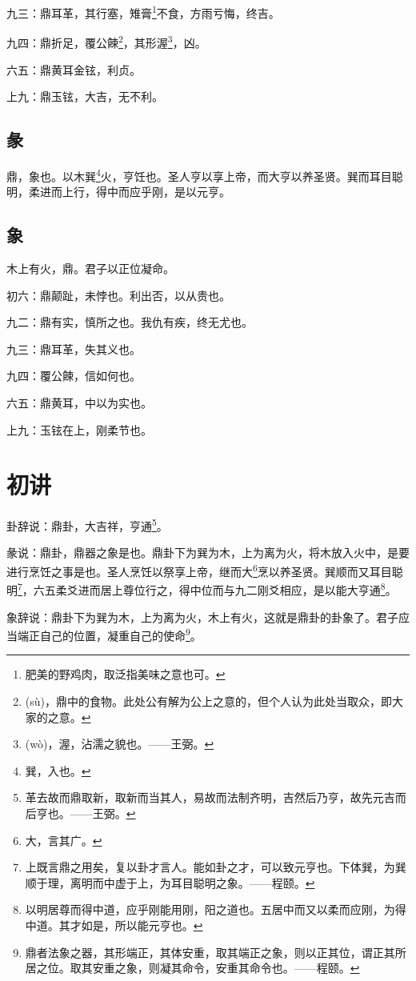 \documentclass[12pt,oneside]{book}
\begin{document}
九三：鼎耳革，其行塞，雉膏\footnote{肥美的野鸡肉，取泛指美味之意也可。}不食，方雨亏悔，终吉。

九四：鼎折足，覆公餗\footnote{(sù)，鼎中的食物。此处公有解为公上之意的，但个人认为此处当取众，即大家的之意。}，其形渥\footnote{(wò)，渥，沾濡之貌也。——王弼。}，凶。

六五：鼎黄耳金铉，利贞。

上九：鼎玉铉，大吉，无不利。

\subsection{彖}
鼎，象也。以木巽\footnote{巽，入也。}火，亨饪也。圣人亨以享上帝，而大亨以养圣贤。巽而耳目聪明，柔进而上行，得中而应乎刚，是以元亨。

\subsection{象}
木上有火，鼎。君子以正位凝命。

初六：鼎颠趾，未悖也。利出否，以从贵也。

九二：鼎有实，慎所之也。我仇有疾，终无尤也。

九三：鼎耳革，失其义也。

九四：覆公餗，信如何也。

六五：鼎黄耳，中以为实也。

上九：玉铉在上，刚柔节也。

\section{初讲}
卦辞说：鼎卦，大吉祥，亨通\footnote{革去故而鼎取新，取新而当其人，易故而法制齐明，吉然后乃亨，故先元吉而后亨也。——王弼。}。

彖说：鼎卦，鼎器之象是也。鼎卦下为巽为木，上为离为火，将木放入火中，是要进行烹饪之事是也。圣人烹饪以祭享上帝，继而大\footnote{大，言其广。}烹以养圣贤。巽顺而又耳目聪明\footnote{上既言鼎之用矣，复以卦才言人。能如卦之才，可以致元亨也。下体巽，为巽顺于理，离明而中虚于上，为耳目聪明之象。——程颐。}，六五柔爻进而居上尊位行之，得中位而与九二刚爻相应，是以能大亨通\footnote{以明居尊而得中道，应乎刚能用刚，阳之道也。五居中而又以柔而应刚，为得中道。其才如是，所以能元亨也。}。

象辞说：鼎卦下为巽为木，上为离为火，木上有火，这就是鼎卦的卦象了。君子应当端正自己的位置，凝重自己的使命\footnote{鼎者法象之器，其形端正，其体安重，取其端正之象，则以正其位，谓正其所居之位。取其安重之象，则凝其命令，安重其命令也。——程颐。}。
\end{document}
